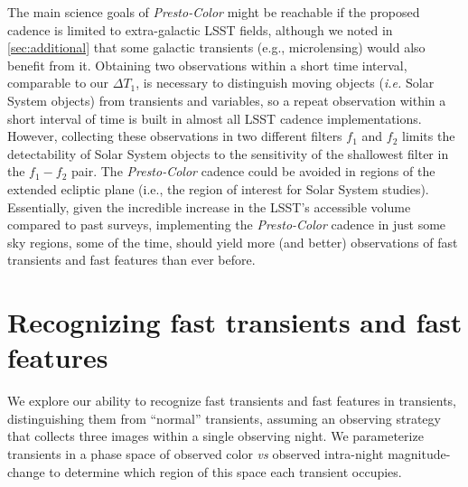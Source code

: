\documentclass[letterpaper,longauthor,trackchanges,twocolumn,onecolappendix,sort&compress]{aastex62}
\newcommand{\dtone}{\ensuremath{\Delta T_1}}
\begin{document}
The main science goals of {\em Presto-Color} might be reachable if the proposed cadence is limited to extra-galactic LSST fields, although we noted in \autoref{sec:additional} that some galactic transients (e.g., microlensing) would also benefit from it. Obtaining two observations within a short time interval, comparable to our \dtone, is necessary to distinguish moving objects (\emph{i.e.} Solar System objects) from transients and variables, so a repeat observation within a short interval of time is built in almost all LSST cadence implementations. However, collecting these observations in two different filters $f_1$ and $f_2$  limits the detectability of Solar System objects to the sensitivity of the shallowest filter in the $f_1-f_2$ pair. The {\em Presto-Color} cadence could be avoided in regions of the extended ecliptic plane (i.e., the region of interest for Solar System studies). Essentially, given the incredible increase in the LSST's accessible volume compared to past surveys, implementing the {\em Presto-Color} cadence in just some sky regions, some of the time, should yield more (and better) observations of fast transients and fast features than ever before.



\section{Recognizing fast transients and fast features}

We explore our ability to recognize fast transients and fast features in transients, distinguishing them from ``normal'' transients, assuming an observing strategy that collects three images within a single observing night. We parameterize transients in a phase space of observed color \emph{vs} observed intra-night magnitude-change to determine which region of this space each transient occupies. 


\end{document}
